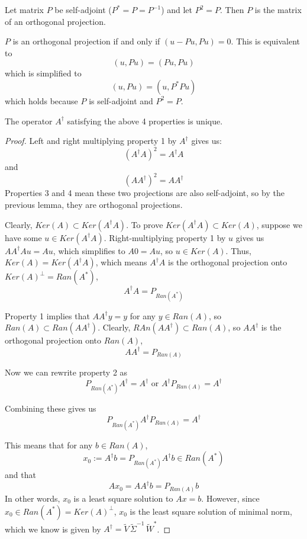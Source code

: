 \begin{lemma}
Let matrix $P$ be self-adjoint ($P^{*} = P = P^{-1}$) and let $P^{2} = P$. Then $P$ is the matrix of an orthogonal projection.
\end{lemma}

\begin{lproof}
$P$ is an orthogonal projection if and only if $(u - Pu, Pu) = 0$. This is equivalent to 
$$(u, Pu) = (Pu, Pu)$$
which is simplified to 
$$(u, Pu) = (u, P^{*}Pu)$$
which holds because $P$ is self-adjoint and $P^{2} = P$. 
\end{lproof}

\begin{theorem}
The operator $A^{\dagger}$ satisfying the above 4 properties is unique. 
\end{theorem}

\begin{proof}
Left and right multiplying property 1 by $A^{\dagger}$ gives us: 
$$(A^{\dagger} A)^{2} = A^{\dagger} A$$ 
and
$$ (AA^{\dagger})^{2} = AA^{\dagger}$$
Properties 3 and 4 mean these two projections are also self-adjoint, so by the previous lemma, they are orthogonal projections. 

Clearly, $Ker(A) \subset Ker(A^{\dagger}A)$. To prove $Ker(A^{\dagger} A) \subset Ker(A)$, suppose we have some $u \in Ker(A^{\dagger} A)$. Right-multiplying property 1 by $u$ gives us $AA^{\dagger}Au = Au$, which simplifies to $A0 = Au$, so $u \in Ker(A)$. Thus, $Ker(A) = Ker(A^{\dagger}A)$, which means $A^{\dagger}A$ is the orthogonal projection onto $Ker(A)^{\perp} = Ran(A^{*})$, 
$$A^{\dagger}A = P_{Ran(A^{*})}$$

Property 1 implies that $AA^{\dagger} y = y$ for any $y \in Ran(A)$, so $Ran(A) \subset Ran(AA^{\dagger})$. Clearly, $RAn(AA^{\dagger}) \subset Ran(A)$, so $AA^{\dagger}$ is the orthogonal projection onto $Ran(A)$, 
$$AA^{\dagger} = P_{Ran(A)}$$

Now we can rewrite property 2 as 
$$P_{Ran(A^{*})} A^{\dagger} = A^{\dagger} \text{ or } A^{\dagger} P_{Ran(A)} = A^{\dagger}$$

Combining these gives us 
$$P_{Ran(A^{*})} A^{\dagger} P_{Ran(A)} = A^{\dagger}$$

This means that for any $b \in Ran(A)$, 
$$x_{0} := A^{\dagger} b = P_{Ran(A^{*})} A^{\dagger} b \in Ran(A^{*})$$
and that 
$$Ax_{0} = AA^{\dagger} b = P_{Ran(A)} b$$
In other words, $x_{0}$ is a least square solution to $Ax = b$. However, since $x_{0} \in Ran(A^{*}) = Ker(A)^{\perp}$, $x_{0}$ is the least square solution of minimal norm, which we know is given by $A^{\dagger} = \widetilde{V} \, \widetilde{\Sigma}^{-1} \, \widetilde{W}^{*}$.
\end{proof}

